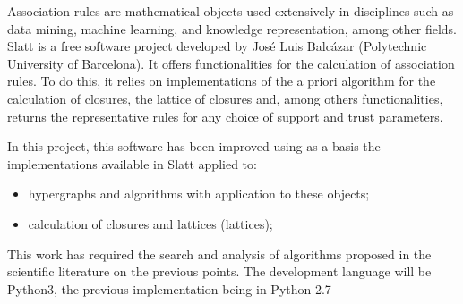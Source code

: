 Association rules are mathematical objects used extensively in disciplines such as data mining, machine learning, and knowledge representation, among other fields.
Slatt is a free software project developed by José Luis Balcázar (Polytechnic University of Barcelona). It offers functionalities for the calculation of association rules. To do this, it relies on implementations of the a priori algorithm for the calculation of closures, the lattice of closures and, among others
functionalities, returns the representative rules for any choice of support and trust parameters.

In this project, this software has been improved using as a basis the implementations available in Slatt applied to:

\begin{itemize}
    \item hypergraphs and algorithms with application to these objects;
    
    \item calculation of closures and lattices (lattices);
\end{itemize}


This work has required the search and analysis of algorithms proposed in the scientific literature on the previous points.
The development language will be Python3, the previous implementation being in Python 2.7
